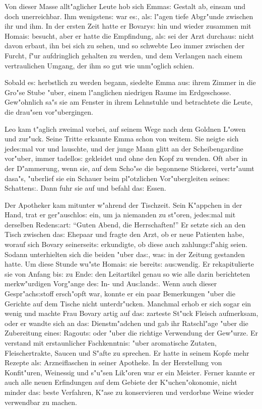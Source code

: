 \documentclass[oneside,12pt]{book}
\newcommand{\s}{s:}%
\begin{document}
Von dieser Masse allt"aglicher Leute hob sich Emma{\s} Gestalt ab,
einsam und doch unerreichbar. Ihm wenigsten{\s} war e{\s}, al{\s}
l"agen tiefe Abgr"unde zwischen ihr und ihm. In der ersten Zeit
hatte er Bovary{\s} hin und wieder zusammen mit Homai{\s} besucht,
aber er hatte die Empfindung, al{\s} sei der Arzt durchau{\s}
nicht davon erbaut, ihn bei sich zu sehen, und so schwebte Leo
immer zwischen der Furcht, f"ur aufdringlich gehalten zu werden,
und dem Verlangen nach einem vertraulichen Umgang, der ihm so gut
wie unm"oglich schien.


\newpage\begin{center}
{\large \so{Vierte{\s} Kapitel}}\bigskip\bigskip
\end{center}

Sobald e{\s} herbstlich zu werden begann, siedelte Emma au{\s}
ihrem Zimmer in die Gro"se Stube "uber, einem l"anglichen
niedrigen Raume im Erdgeschosse. Gew"ohnlich sa"s sie am Fenster
in ihrem Lehnstuhle und betrachtete die Leute, die drau"sen
vor"ubergingen.

Leo kam t"aglich zweimal vorbei, auf seinem Wege nach dem Goldnen
L"owen und zur"uck. Seine Tritte erkannte Emma schon von weitem.
Sie neigte sich jede{\s}mal vor und lauschte, und der junge Mann
glitt an der Scheibengardine vor"uber, immer tadello{\s} gekleidet
und ohne den Kopf zu wenden. Oft aber in der D"ammerung, wenn sie,
auf dem Scho"se die begonnene Stickerei, vertr"aumt dasa"s,
"uberlief sie ein Schauer beim pl"otzlichen Vor"ubergleiten
seine{\s} Schatten{\s}. Dann fuhr sie auf und befahl da{\s} Essen.

Der Apotheker kam mitunter w"ahrend der Tischzeit. Sein K"appchen
in der Hand, trat er ger"auschlo{\s} ein, um ja niemanden zu
st"oren, jede{\s}mal mit derselben Reden{\s}art: "`Guten Abend,
die Herrschaften!"' Er setzte sich an den Tisch zwischen da{\s}
Ehepaar und fragte den Arzt, ob er neue Patienten habe, worauf
sich Bovary seinerseit{\s} erkundigte, ob diese auch
zahlung{\s}f"ahig seien. Sodann unterhielten sich die beiden "uber
da{\s}, wa{\s} in der Zeitung gestanden hatte. Um diese Stunde
wu"ste Homai{\s} sie bereit{\s} au{\s}wendig. Er rekapitulierte
sie von Anfang bi{\s} zu Ende: den Leitartikel genau so wie alle
darin berichteten merkw"urdigen Vorg"ange de{\s} In- und
Au{\s}land{\s}. Wenn auch dieser Gespr"ach{\s}stoff ersch"opft
war, konnte er ein paar Bemerkungen "uber die Gerichte auf dem
Tische nicht unterdr"ucken. Manchmal erhob er sich sogar ein wenig
und machte Frau Bovary artig auf da{\s} zarteste St"uck Fleisch
aufmerksam, oder er wandte sich an da{\s} Dienstm"adchen und gab
ihr Ratschl"age "uber die Zubereitung eine{\s} Ragout{\s} oder
"uber die richtige Verwendung der Gew"urze. Er verstand mit
erstaunlicher Fachkenntni{\s} "uber aromatische Zutaten,
Fleischertrakte, Saucen und S"afte zu sprechen. Er hatte in seinem
Kopfe mehr Rezepte al{\s} Arzneiflaschen in seiner Apotheke. In
der Herstellung von Konfit"uren, Weinessig und s"u"sen Lik"oren
war er ein Meister. Ferner kannte er auch alle neuen Erfindungen
auf dem Gebiete der K"uchen"okonomie, nicht minder da{\s} beste
Verfahren, K"ase zu konservieren und verdorbne Weine wieder
verwendbar zu machen.
\end{document}
